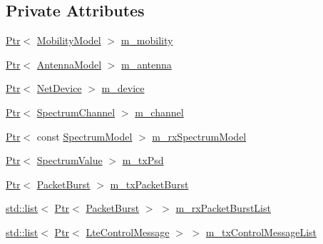 \subsection*{Private Attributes}
\begin{DoxyCompactItemize}
\item 
\hyperlink{classns3_1_1Ptr}{Ptr}$<$ \hyperlink{classns3_1_1MobilityModel}{Mobility\+Model} $>$ \hyperlink{classns3_1_1LteSpectrumPhy_ac2560972def39e79688ce7e33c694cb8}{m\+\_\+mobility}
\item 
\hyperlink{classns3_1_1Ptr}{Ptr}$<$ \hyperlink{classns3_1_1AntennaModel}{Antenna\+Model} $>$ \hyperlink{classns3_1_1LteSpectrumPhy_a99c269c50198172fecd23b2eab9da193}{m\+\_\+antenna}
\item 
\hyperlink{classns3_1_1Ptr}{Ptr}$<$ \hyperlink{classns3_1_1NetDevice}{Net\+Device} $>$ \hyperlink{classns3_1_1LteSpectrumPhy_a4dd5b150d5bc98b5bf7aa5495972f17f}{m\+\_\+device}
\item 
\hyperlink{classns3_1_1Ptr}{Ptr}$<$ \hyperlink{classns3_1_1SpectrumChannel}{Spectrum\+Channel} $>$ \hyperlink{classns3_1_1LteSpectrumPhy_a83821e104a67268a379c06cfe65f7417}{m\+\_\+channel}
\item 
\hyperlink{classns3_1_1Ptr}{Ptr}$<$ const \hyperlink{classns3_1_1SpectrumModel}{Spectrum\+Model} $>$ \hyperlink{classns3_1_1LteSpectrumPhy_a0b99aea1a79788a2170f78b7de52a30a}{m\+\_\+rx\+Spectrum\+Model}
\item 
\hyperlink{classns3_1_1Ptr}{Ptr}$<$ \hyperlink{classns3_1_1SpectrumValue}{Spectrum\+Value} $>$ \hyperlink{classns3_1_1LteSpectrumPhy_a5db966e9422290886f779dbbf1cbd146}{m\+\_\+tx\+Psd}
\item 
\hyperlink{classns3_1_1Ptr}{Ptr}$<$ \hyperlink{classns3_1_1PacketBurst}{Packet\+Burst} $>$ \hyperlink{classns3_1_1LteSpectrumPhy_a9f77709c77cf2b1bcae046b9bc136631}{m\+\_\+tx\+Packet\+Burst}
\item 
\hyperlink{openflow-interface_8h_afd9bcfa176617760671b67580f536fa7}{std\+::list}$<$ \hyperlink{classns3_1_1Ptr}{Ptr}$<$ \hyperlink{classns3_1_1PacketBurst}{Packet\+Burst} $>$ $>$ \hyperlink{classns3_1_1LteSpectrumPhy_ae74163b2a9dd7db93b172204c833ce4f}{m\+\_\+rx\+Packet\+Burst\+List}
\item 
\hyperlink{openflow-interface_8h_afd9bcfa176617760671b67580f536fa7}{std\+::list}$<$ \hyperlink{classns3_1_1Ptr}{Ptr}$<$ \hyperlink{classns3_1_1LteControlMessage}{Lte\+Control\+Message} $>$ $>$ \hyperlink{classns3_1_1LteSpectrumPhy_adefbf67a83c42b2bdc7fc72295d9735a}{m\+\_\+tx\+Control\+Message\+List}
\item 

\end{DoxyCompactItemize}
